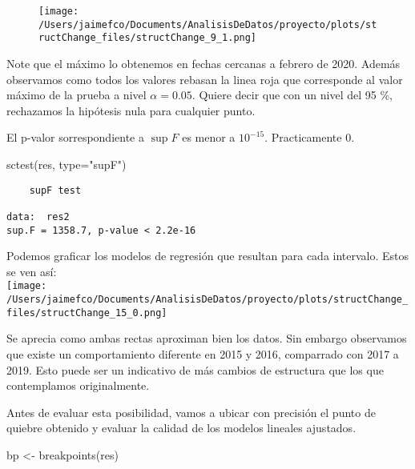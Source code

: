 \documentclass[
]{article}
\newenvironment{Shaded}{}{}
\newcommand{\AttributeTok}[1]{\textcolor[rgb]{0.49,0.56,0.16}{#1}}
\newcommand{\FunctionTok}[1]{\textcolor[rgb]{0.02,0.16,0.49}{#1}}
\newcommand{\NormalTok}[1]{#1}
\newcommand{\OtherTok}[1]{\textcolor[rgb]{0.00,0.44,0.13}{#1}}
\newcommand{\SpecialCharTok}[1]{\textcolor[rgb]{0.25,0.44,0.63}{#1}}
\newcommand{\StringTok}[1]{\textcolor[rgb]{0.25,0.44,0.63}{#1}}
\begin{document}
\begin{figure}
\centering
\texttt{[image: /Users/jaimefco/Documents/AnalisisDeDatos/proyecto/plots/structChange\_files/structChange\_9\_1.png]}
\caption{}
\end{figure}

Note que el máximo lo obtenemos en fechas cercanas a febrero de 2020.
Además observamos como todos los valores rebasan la linea roja que
corresponde al valor máximo de la prueba a nivel \(\alpha=0.05\). Quiere
decir que con un nivel del 95 \%, rechazamos la hipótesis nula para
cualquier punto.

El p-valor sorrespondiente a \(\sup F\) es menor a \(10^{-15}\).
Practicamente 0.

\begin{Shaded}
\begin{Highlighting}[]
\FunctionTok{sctest}\NormalTok{(res, }\AttributeTok{type=}\StringTok{"supF"}\NormalTok{)}
\end{Highlighting}
\end{Shaded}

\begin{verbatim}
	supF test

data:  res2
sup.F = 1358.7, p-value < 2.2e-16
\end{verbatim}

Podemos graficar los modelos de regresión que resultan para cada
intervalo. Estos se ven así:\\
\texttt{[image: /Users/jaimefco/Documents/AnalisisDeDatos/proyecto/plots/structChange\_files/structChange\_15\_0.png]}

Se aprecia como ambas rectas aproximan bien los datos. Sin embargo
observamos que existe un comportamiento diferente en 2015 y 2016,
comparrado con 2017 a 2019. Esto puede ser un indicativo de más cambios
de estructura que los que contemplamos originalmente.

Antes de evaluar esta posibilidad, vamos a ubicar con precisión el punto
de quiebre obtenido y evaluar la calidad de los modelos lineales
ajustados.

\begin{Shaded}
\begin{Highlighting}[]
\NormalTok{bp }\OtherTok{\textless{}{-}} \FunctionTok{breakpoints}\NormalTok{(res)}
\end{Highlighting}
\end{Shaded}

\begin{Shaded}
\end{Shaded}
\end{document}
